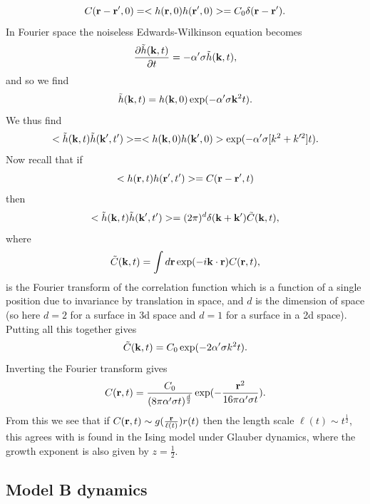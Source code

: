 \begin{equation}
    C({\bf r}-{\bf r}',0)= < h({\bf r},0)h({\bf r}',0)> =C_0 \delta({\bf r}-{\bf r}').
\end{equation}
In Fourier space the noiseless Edwards-Wilkinson equation becomes
\begin{equation}
    \frac{\partial\tilde h({\bf k},t)}{\partial t} = -\alpha'\sigma \tilde h({\bf k},t) ,
\end{equation}
and so we find
\begin{equation}
    \tilde h({\bf k},t) = h({\bf k},0)\exp(-\alpha'\sigma{\bf k}^2 t).
\end{equation}
We thus find 
\begin{equation}
    < \tilde h({\bf k},t)\tilde h({\bf k}',t')> = < h({\bf k},0)h({\bf k}',0)> \exp(-    \alpha'\sigma[k^2+k'^2] t).
\end{equation}
Now recall that if 
\begin{equation}
    <  h({\bf r},t) h({\bf r}',t')> =C({\bf r}-{\bf r}',t)
\end{equation}
then
\begin{equation}
    < \tilde h({\bf k},t)\tilde h({\bf k}',t')>= (2\pi)^d \delta({\bf k}+{\bf k}') \tilde C({\bf k},t),
\end{equation}
where 
\begin{equation}
    \tilde C({\bf k},t)= \int d{\bf r} \exp(-i{\bf k}\cdot {\bf r})C({\bf r},t),
\end{equation}
is the Fourier transform of the correlation function which is a function of a single position due to invariance by translation in space, and $d$ is the dimension of space (so here $d=2$ for a surface in 3d space and $d=1$ for a surface in a 2d space). Putting all this together gives
\begin{equation}
    \tilde C({\bf k},t)= C_0 \exp(-2\alpha'\sigma k^2 t).
\end{equation}
Inverting the Fourier transform gives
\begin{equation}
    C({\bf r},t)= \frac{C_0}{(8\pi \alpha'\sigma t)^{\frac{d}{2}}} \exp(-\frac{{\bf r}^2}{16\pi \alpha'\sigma t}).
\end{equation}
From this we see that if $C({\bf r},t)\sim g(\frac{{\bf r}}{\ell(t)})r(t)$ then the length scale $\ell(t)\sim t^{\frac{1}{2}}$, this agrees with is found in the Ising model under Glauber dynamics, where the growth exponent is also given by $z=\frac{1}{2}$.

    \subsection{Model B dynamics}

